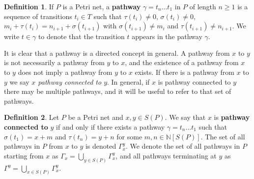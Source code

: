 \documentclass[aps,prd,onecolumn,nofootinbib,letterpaper,preprintnumbers,superscriptaddress,eqsecnum]{revtex4}
\theoremstyle{definition}
\newtheorem{definition}{Definition}
\newcommand{\N}{\mathbb{N}}
\begin{document}
\begin{definition}\label{def:pathway}
    If $P$ is a Petri net, a \textbf{pathway} $\gamma = t_n \ldots t_1$ in $P$ of length $n \ge 1$ is a sequence of transitions $t_i \in T$ such that $\tau(t_i) \ne 0$, $\sigma(t_i) \ne 0$, $m_{i} + \tau(t_i) = n_{i+1} + \sigma(t_{i+1})$ with $\sigma(t_{i+1}) \ne m_{i}$ and $\tau(t_{i+1}) \ne n_{i+1}$. We write $t \in \gamma$ to denote that the transition $t$ appears in the pathway $\gamma$.
\end{definition}

It is clear that a pathway is a directed concept in general.
A pathway from $x$ to $y$ is not necessarily a pathway from $y$ to $x$, and the existence of a pathway from $x$ to $y$ does not imply a pathway from $y$ to $x$ exists.
If there is a pathway from $x$ to $y$ we say \textit{$x$ pathway connected to $y$}.
In general, if $x$ is pathway connected to $y$ there may be multiple pathways, and it will be useful to refer to that set of pathways.

\begin{definition}\label{def:pathway-connected}
    Let $P$ be a Petri net and $x,y \in S(P)$.
    We say that $x$ is \textbf{pathway connected to} $y$ if and only if there exists a pathway $\gamma = t_n \ldots t_1$ such that $\sigma(t_1) = x + m$ and $\tau(t_n) = y + n$ for some $m, n \in \N[S(P)]$.
    The set of all pathways in $P$ from $x$ to $y$ is denoted $\Gamma_x^y$.
    We denote the set of all pathways in $P$ starting from $x$ as $\Gamma_x = \bigcup_{y \in S(P)} \Gamma_x^y$, and all pathways terminating at $y$ as $\Gamma^y = \bigcup_{x \in S(P)} \Gamma_x^y$.
\end{definition}
\end{document}
